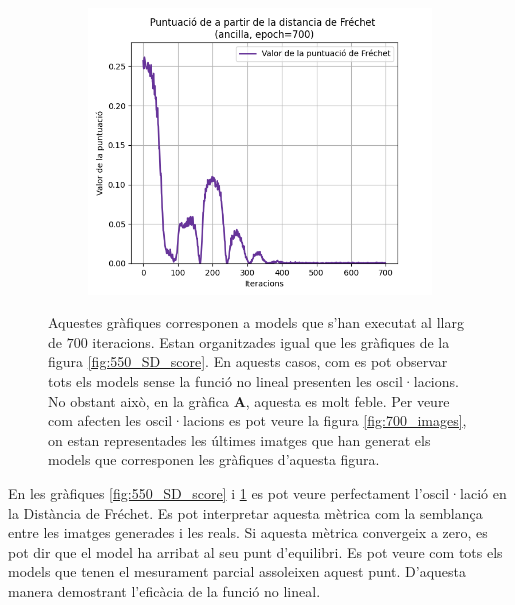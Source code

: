 \begin{figure}[H]
\begin{subfigure}[b]{.32\linewidth}
		\includegraphics[width=\linewidth]{figures/data/FD_score_A6.png}
		\caption{}
	\end{subfigure}
	\caption{Aquestes gràfiques corresponen a models que s'han executat al llarg de $700$ iteracions. Estan organitzades igual que les gràfiques de la figura \ref{fig:550_SD_score}. En aquests casos, com es pot observar tots els models sense la funció no lineal presenten les oscil·lacions. No obstant això, en la gràfica \textbf{A}, aquesta es molt feble. Per veure com afecten les oscil·lacions es pot veure la figura \ref{fig:700_images}, on estan representades les últimes imatges que han generat els models que corresponen les gràfiques d'aquesta figura.}
	\label{fig:700_SD_score}
\end{figure}

En les gràfiques \ref{fig:550_SD_score} i \ref{fig:700_SD_score} es pot veure perfectament l'oscil·lació en la Distància de Fréchet. Es pot interpretar aquesta mètrica com la semblança entre les imatges generades i les reals. Si aquesta mètrica convergeix a zero, es pot dir que el model ha arribat al seu punt d'equilibri. Es pot veure com tots els models que tenen el mesurament parcial assoleixen aquest punt. D'aquesta manera demostrant l'eficàcia de la funció no lineal.

